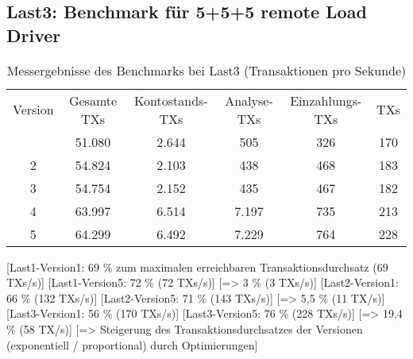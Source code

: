 \subsection{Last3: Benchmark für 5+5+5 remote Load Driver}\label{subsec:benchmark-5-5-5-remote-load-driver}
\begin{table}[h]
    \centering
        \begin{tabular}{|c|c|c|c|c|c|}
            \hline
            Version & Gesamte TXs & Kontostands-TXs & Analyse-TXs  & Einzahlungs-TXs & TXs \\  \hlinen
            1 & 51.080 & 2.644 & 505 & 326 & 170 \\ \hline
            2 & 54.824 & 2.103 & 438 & 468 & 183 \\ \hline
            3 & 54.754 & 2.152 & 435 & 467 & 182 \\ \hline
            4 & 63.997 & 6.514 & 7.197 & 735 & 213 \\ \hline
            5 & 64.299 & 6.492 & 7.229 & 764 & 228 \\ \hline
        \end{tabular}
        \caption{Messergebnisse des Benchmarks bei Last3 (Transaktionen pro Sekunde)}
        \label{tab:5}
\end{table}

[Last1-Version1: 69 \% zum maximalen erreichbaren Transaktionsdurchsatz (69 TXs/s)]
[Last1-Version5: 72 \% (72 TXs/s)] [=> 3 \% (3 TXs/s)]
[Last2-Version1: 66 \% (132 TXs/s)]
[Last2-Version5: 71 \% (143 TXs/s)] [=> 5,5 \% (11 TX/s)]
[Last3-Version1: 56 \% (170 TXs/s)]
[Last3-Version5: 76 \% (228 TXs/s)] [=> 19,4 \% (58 TX/s)]
[=> Steigerung des Transaktionsdurchsatzes der Versionen (exponentiell / proportional) durch Optimierungen]